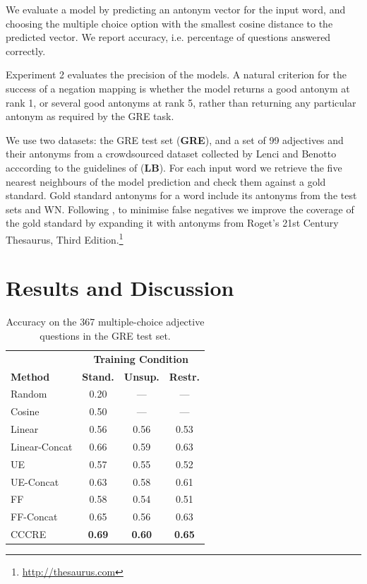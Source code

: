\documentclass[11pt]{article}
\begin{document}
We evaluate a model by predicting an antonym vector for the input word, and choosing the multiple choice option with the smallest cosine distance to the predicted vector. We report accuracy, i.e. percentage of questions answered correctly.

Experiment 2 evaluates the precision of the models. 
A natural criterion for the success of a negation mapping is whether the model returns a good antonym at rank 1, or several good antonyms at rank 5, rather than returning any particular antonym as required by the GRE task.


We use two datasets: the GRE test set ({\bf GRE}), and a set of 99 adjectives and their
antonyms from a crowdsourced dataset collected by Lenci and Benotto
acccording to the guidelines of \citet{walde:13} ({\bf LB}). For each input word we retrieve the five nearest neighbours of the model prediction and 
check them against a gold standard.
Gold standard antonyms for a word include its antonyms from the test sets and WN. Following \citet{gorman:05}, to minimise false negatives we improve the coverage of the gold standard by expanding it with antonyms from 
Roget's 21st Century Thesaurus, Third
Edition.\footnote{\url{http://thesaurus.com}} 


\section{Results and Discussion}
\begin{table}[t!]
\centering
\small
\begin{tabular}{lccc}
 & \multicolumn{3}{c}{\bf Training Condition} \\
\bf Method & \bf Stand. & \bf Unsup. & \bf Restr. \\
\hline
\hline
Random & 0.20 & --- & --- \\
Cosine & 0.50 & --- & --- \\
\hline
Linear & 0.56 & 0.56 & 0.53 \\
Linear-Concat & 0.66 & 0.59 & 0.63 \\
\hline
UE & 0.57 & 0.55 & 0.52 \\
UE-Concat & 0.63 & 0.58 & 0.61 \\
FF & 0.58 & 0.54 & 0.51 \\
FF-Concat & 0.65 & 0.56 & 0.63 \\
\hline
CCCRE & \bf 0.69 & \bf 0.60 & \bf 0.65 \\
\end{tabular} 
\caption{Accuracy on the 367 multiple-choice adjective questions in the GRE test set.}
\label{t:gre}
\end{table}
\end{document}
